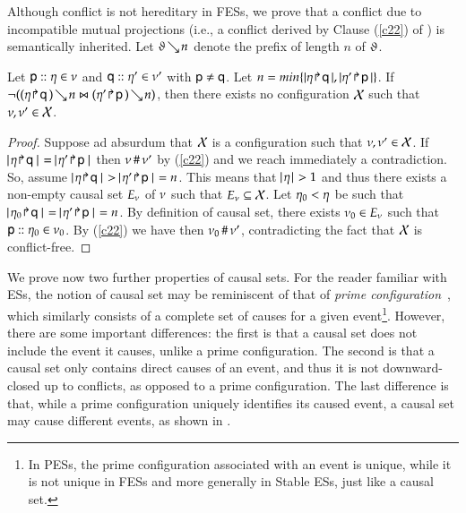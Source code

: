 Although conflict is not hereditary in FESs, we prove that a conflict
due to incompatible mutual projections (i.e., a conflict derived by
Clause (\ref{c22}) of ) is semantically
inherited.  Let $\vartheta\! \searrow \!n$ denote the prefix of length $n$ of $\vartheta$.

\begin{proposition}
Let ${\sf p}:: \eta\in \nu$ and ${\sf q}:: \eta'\in\nu'$ with ${\sf p}\not={\sf q}$.
Let $n=min \{|\eta \! \Rsh \! {\sf q}\,|,|\eta' \! \Rsh \! {\sf p}\,|\}$. 
If $\neg(\dualev{\tr{(\projb\procev\q)}n}{\tr{(\projb{\procev'}\pp)}n})$,
then there exists no configuration $\mathcal{X}$ such that $\nu,
\nu'\in \mathcal{X}$. 
\end{proposition}
\begin{proof}
  Suppose ad absurdum that $\mathcal{X}$ is a configuration such that
  $\nu, \nu'\in \mathcal{X}$. If $\cardin{\projb\procev\q} =
  \cardin{\projb{\procev'}\pp}$ then $\nu \,\#\,\nu '$ by
  (\ref{c22}) and we reach immediately a
  contradiction.  So, assume $\cardin{\projb\procev\q} >
  \cardin{\projb{\procev'}\pp} = n$. This means that $\!\!~|~\! \eta\!~|~\!
  > 1$ and thus there exists a non-empty causal set $E_\nu$ of
  $\nu$ such that $E_\nu \subseteq\mathcal{X}$.  Let $\eta_0 <
  \eta$ be such that $\cardin{\projb{\procev_0}\q}
  =\cardin{\projb{\procev'}\pp} =n$.  By definition of causal set,
  there exists $\nu_0 \in E_\nu$ such that
  ${\sf p}:: \eta_0\in \nu_0$. By
  (\ref{c22}) we have then $\nu_0\,\#\,
  \nu'$, contradicting the fact that $\mathcal{X}$ is conflict-free. 
\end{proof}




We prove now two further properties of causal sets. 
For the reader familiar with ESs, the notion of causal set may be
reminiscent of that of \emph{prime configuration}~\cite{Winskel80},
which similarly consists of a complete set of causes for a given
event\footnote{In PESs, the prime configuration associated with an
  event is unique, while it is not unique in FESs and more generally
  in Stable ESs, just like a causal set.}. However, there are some
important differences: the first is that a causal set does not include
the event it causes, unlike a prime configuration. The second is that
a causal set only contains direct causes of an event, and thus it is
not downward-closed up to conflicts, as opposed to a prime
configuration. The last difference is that, while a prime
configuration uniquely identifies its caused event, a causal set may
cause different events, as shown in .


